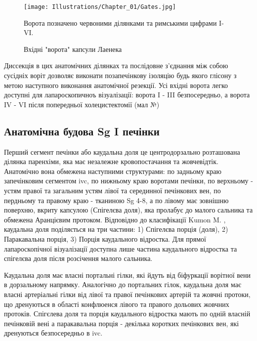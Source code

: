 \begin{refsection}
\begin{figure}[htbp]
\caption{Вхідні "ворота" капсули Лаенека}

\texttt{[image: Illustrations/Chapter\_01/Gates.jpg]}
\label{fig:Gates}

\small
Ворота позначено червоними ділянками та римськими цифрами I-VI.
\end{figure}


Диссекція в цих анатомічних ділянках та послідовне з'єднання між собою сусідніх воріт дозволяє виконати позапечінкову ізоляцію будь якого глісону з метою наступного виконання анатомічної резекції. Усі вхідні ворота легко доступні для лапароскопичноъ візуалізації: ворота I - III безпосередньо, а ворота IV - VI після попередньої холецистектомії (мал №)

\subsection{Анатомічна будова Sg I печінки}

Перший сегмент печінки або каудальна доля це центродорзально розташована ділянка паренхіми, яка має незалежне кровопостачання та жовчевідтік. Анатомічно вона обмежена наступними структурами: по задньому краю запечінковим сегментом \acrshort{ivc}, по нижньому краю воротами печінки, по верхньому - устям правої та загальним устям лівої та серединної печінкових вен, по пердньому та правому краю - тканиною Sg 4-8, а по лівому має зовнішню поверхню, вкриту капсулою (Спігелєва доля), яка пролабує до малого сальника та обмежена Аранцієвим протоком. Відповідно до класифікації Kumon M. \cite{Kumon2017}, каудальна доля поділяється на три частини: 1) Спігелєва порція (доля),  2) Паракавальна порція, 3) Порція каудального відростка. Для прямої лапароскопічної візуалізації  доступна лише частина каудального відростка та спігелєва доля після розсічення малого сальника.

Каудальна доля має власні портальні гілки, які йдуть від біфуркації ворітної вени в дорзальному напрямку. Аналогічно до портальних гілок, каудальна доля має власні артеріальні гілки від лівої та правої печінкових артерій та жовчні протоки, що дренуються в області конфлюенся лівого та правого дольових жовчних протоків. Спігєлева доля та порція каудального відростка мають по одній власній печінковій вені а паракавальна порція - декілька коротких печінкових вен, які дренуються безпосередньо в \acrshort{ivc}. 


\end{refsection}
